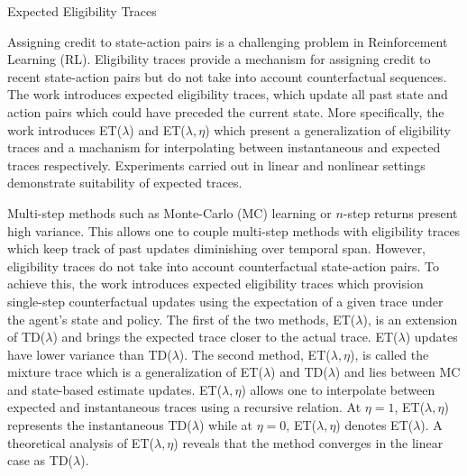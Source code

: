 \documentclass[11pt,letterpaper]{article}
\begin{document}
\begin{center}
  \large{Expected Eligibility Traces}
\end{center}

Assigning credit to state-action pairs is a challenging problem in Reinforcement Learning (RL). Eligibility traces provide a mechanism for assigning credit to recent state-action pairs but do not take into account counterfactual sequences. The work introduces expected eligibility traces, which update all past state and action pairs which could have preceded the current state. More specifically, the work introduces ET($\lambda$) and ET($\lambda,\eta$) which present a generalization of eligibility traces and a machanism for interpolating between instantaneous and expected traces respectively. Experiments carried out in linear and nonlinear settings demonstrate suitability of expected traces. 

Multi-step methods such as Monte-Carlo (MC) learning or $n$-step returns present high variance. This allows one to couple multi-step methods with eligibility traces which keep track of past updates diminishing over temporal span. However, eligibility traces do not take into account counterfactual state-action pairs. To achieve this, the work introduces expected eligibility traces which provision single-step counterfactual updates using the expectation of a given trace under the agent's state and policy. The first of the two methods, ET($\lambda$), is an extension of TD($\lambda$) and brings the expected trace closer to the actual trace. ET($\lambda$) updates have lower variance than TD($\lambda$). The second method, ET($\lambda,\eta$), is called the mixture trace which is a generalization of ET($\lambda$) and TD($\lambda$) and lies between MC and state-based estimate updates. ET($\lambda,\eta$) allows one to interpolate between expected and instantaneous traces using a recursive relation. At $\eta=1$, ET($\lambda,\eta$) represents the instantaneous TD($\lambda$) while at $\eta=0$, ET($\lambda,\eta$) denotes ET($\lambda$). A theoretical analysis of ET($\lambda,\eta$) reveals that the method converges in the linear case as TD($\lambda$). 
\end{document}
